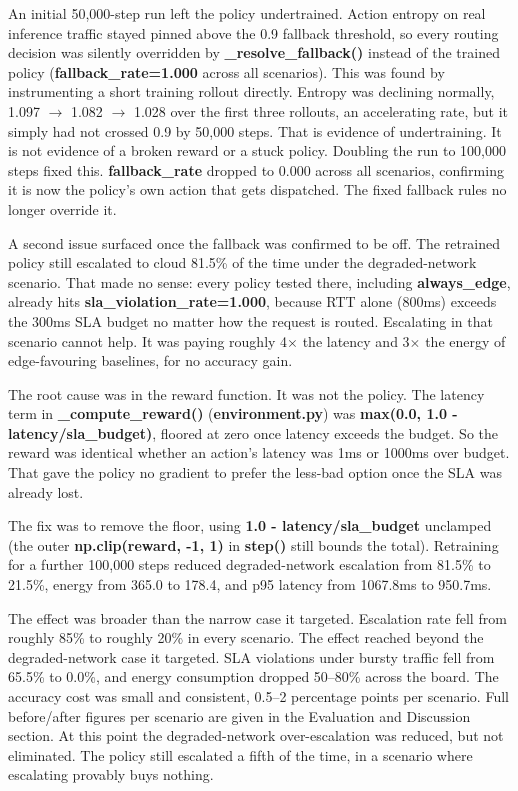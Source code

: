 An initial 50,000-step run left the policy undertrained. Action entropy
on real inference traffic stayed pinned above the 0.9 fallback
threshold, so every routing decision was silently overridden by
\textbf{\_resolve\_fallback()} instead of the trained policy
(\textbf{fallback\_rate=1.000} across all scenarios). This was found by
instrumenting a short training rollout directly. Entropy was declining
normally, 1.097 $\to$ 1.082 $\to$ 1.028 over the first three rollouts,
an accelerating rate, but it simply had not crossed 0.9 by 50,000
steps. That is evidence of undertraining. It is not evidence of a
broken reward or a stuck policy. Doubling the run to 100,000 steps fixed this.
\textbf{fallback\_rate} dropped to 0.000 across all scenarios,
confirming it is now the policy's own action that gets dispatched.
The fixed fallback rules no longer override it.

A second issue surfaced once the fallback was confirmed to be off.
The retrained policy still escalated to cloud 81.5\% of the time
under the degraded-network scenario. That made no sense: every policy
tested there, including \textbf{always\_edge}, already hits
\textbf{sla\_violation\_rate=1.000}, because RTT alone (800ms)
exceeds the 300ms SLA budget no matter how the request is routed.
Escalating in that scenario cannot help. It was paying roughly
4$\times$ the latency and 3$\times$ the energy of edge-favouring
baselines, for no accuracy gain.

The root cause was in the reward function. It was not the policy. The latency
term in \textbf{\_compute\_reward()} (\textbf{environment.py}) was
\textbf{max(0.0, 1.0 - latency/sla\_budget)}, floored at zero once
latency exceeds the budget. So the reward was identical whether an
action's latency was 1ms or 1000ms over budget. That gave the policy no
gradient to prefer the less-bad option once the SLA was already lost.

The fix was to remove the floor, using
\textbf{1.0 - latency/sla\_budget} unclamped (the outer
\textbf{np.clip(reward, -1, 1)} in \textbf{step()} still bounds the
total). Retraining for a further 100,000 steps reduced degraded-network
escalation from 81.5\% to 21.5\%, energy from 365.0 to 178.4, and p95
latency from 1067.8ms to 950.7ms.

The effect was broader than the narrow case it targeted. Escalation
rate fell from roughly 85\% to roughly 20\% in every scenario. The
effect reached beyond the degraded-network case it targeted. SLA violations under bursty traffic fell from
65.5\% to 0.0\%, and energy consumption dropped 50--80\% across the
board. The accuracy cost was small and consistent, 0.5--2 percentage
points per scenario. Full before/after figures per scenario are given
in the Evaluation and Discussion section. At this point the
degraded-network over-escalation was reduced, but not eliminated. The
policy still escalated a fifth of the time, in a scenario where
escalating provably buys nothing.

